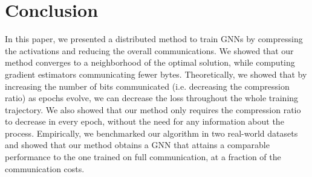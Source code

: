 \documentclass[lettersize,journal]{IEEEtran}
\newcommand{\algo}{\texttt{VARCO}}
\begin{document}
\section{Conclusion}
In this paper, we presented a distributed method to train GNNs by compressing the activations and reducing the overall communications. We showed that our method converges to a neighborhood of the optimal solution, while computing gradient estimators communicating fewer bytes. Theoretically, we showed that by increasing the number of bits communicated (i.e. decreasing the compression ratio) as epochs evolve, we can decrease the loss throughout the whole training trajectory. We also showed that our method only requires the compression ratio to decrease in every epoch, without the need for any information about the process. Empirically, we benchmarked our algorithm in two real-world datasets and showed that our method obtains a GNN that attains a comparable performance to the one trained on full communication, at a fraction of the communication costs. 


% 




\end{document}

